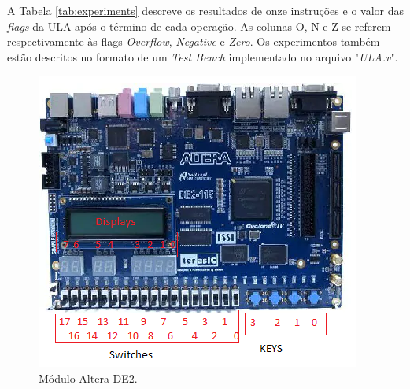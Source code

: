 \documentclass[11pt,a4paper,titlepage]{article}
\begin{document}
A Tabela \ref{tab:experiments} descreve os resultados de onze  instruções e o valor das \textit{flags} da ULA após o término de cada operação. As colunas O, N e Z se referem respectivamente às flags \textit{Overflow}, \textit{Negative} e \textit{Zero}. Os experimentos também estão descritos no formato de um \textit{Test Bench} implementado no arquivo "\textit{ULA.v}".

\begin{figure}[t]
\centering
\includegraphics[]{images/FPGA.png}
\caption{Módulo Altera DE2.}
\label{fig:fpga}
\end{figure}
\end{document}
